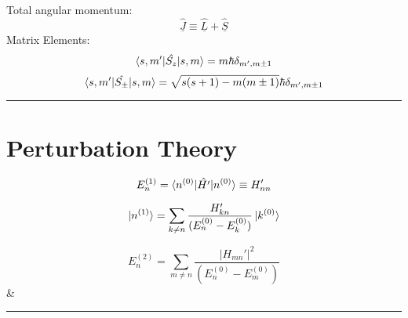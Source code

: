 \documentclass[table,cmyk]{article}
\begin{document}
\begin{longtable}
Total angular momentum:
\[ \hat{\underline{J}} \equiv \hat{\underline{L}}+\hat{\underline{S}}\]
Matrix Elements:
\[\braket{s,m'|\hat{S_z}|s,m} = m\hbar \delta_{m',m\pm1}\]
\[\braket{s,m'|\hat{S_{\pm}}|s,m} = \sqrt{s(s+1)-m(m\pm1)} \hbar \delta_{m',m\pm1}\]
\noindent\rule{7.8cm}{0.4pt}
\section*{Perturbation Theory}
\[E_n^{(1)} = \braket{n^{(0)}|\hat{H'}|n^{(0)}} \equiv H_{nn}'\]

\[ \ket{n^{(1)}} = \sum_{k\ne n} \frac{H_{kn}'}{(E_n^{(0)}-E_k^{(0)})}\ket{k^{(0)}}\]

\[E_n^{(2)} = \sum_{m\ne n} \frac{|H_{mn}'|^2}{(E_n^{(0)}-E_m^{(0)})}\]
&

\noindent\rule{7.8cm}{0.4pt}

\tabularnewline\hline
\end{longtable}
\end{document}
